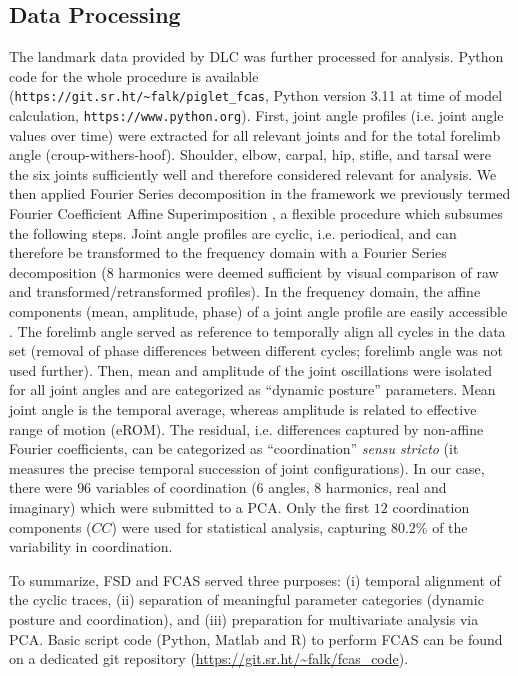 \subsection{Data Processing}
\label{sec:orgcb0a26c}

The landmark data provided by DLC was further processed for analysis.
Python code for the whole procedure is available (\nolinkurl{https://git.sr.ht/~falk/piglet_fcas}, Python version 3.11 at time of model calculation, \nolinkurl{https://www.python.org}).
First, joint angle profiles (i.e. joint angle values over time) were extracted for all relevant joints and for the total forelimb angle (croup-withers-hoof).
Shoulder, elbow, carpal, hip, stifle, and tarsal were the six joints sufficiently well  and therefore considered relevant for analysis.
We then applied Fourier Series decomposition in the framework we previously termed Fourier Coefficient Affine Superimposition \citep[FCAS,][and Ch. \ref{cpt:fourier_review}]{Mielke2019}, a flexible procedure which subsumes the following steps.
Joint angle profiles are cyclic, i.e. periodical, and can therefore be transformed to the frequency domain with a Fourier Series decomposition (8 harmonics were deemed sufficient by visual comparison of raw and transformed/retransformed profiles).
In the frequency domain, the affine components (mean, amplitude, phase) of a joint angle profile are easily accessible \citep[\textit{cf.}][and Ch. \ref{cpt:fcas}]{Mielke2019}.
The forelimb angle served as reference to temporally align all cycles in the data set (removal of phase differences between different cycles; forelimb angle was not used further).
Then, mean and amplitude of the joint oscillations were isolated for all joint angles and are categorized as ``dynamic posture'' parameters.
Mean joint angle is the temporal average, whereas amplitude is related to effective range of motion (eROM).
The residual, i.e. differences captured by non-affine Fourier coefficients, can be categorized as ``coordination'' \emph{sensu stricto} (it measures the precise temporal succession of joint configurations).
In our case, there were
\(96\)
variables of coordination (6  angles, 8 harmonics, real and imaginary) which were submitted to a PCA.
Only the first
\(12\)
coordination components (\(CC\)) were used for statistical analysis, capturing
\(80.2 \%\)
of the variability in coordination.

To summarize, FSD and FCAS served three purposes: (i) temporal alignment of the cyclic traces, (ii) separation of meaningful parameter categories (dynamic posture and coordination), and (iii) preparation for multivariate analysis via PCA.
Basic script code (Python, Matlab and R) to perform FCAS can be found on a dedicated git repository (\url{https://git.sr.ht/\~falk/fcas\_code}).


